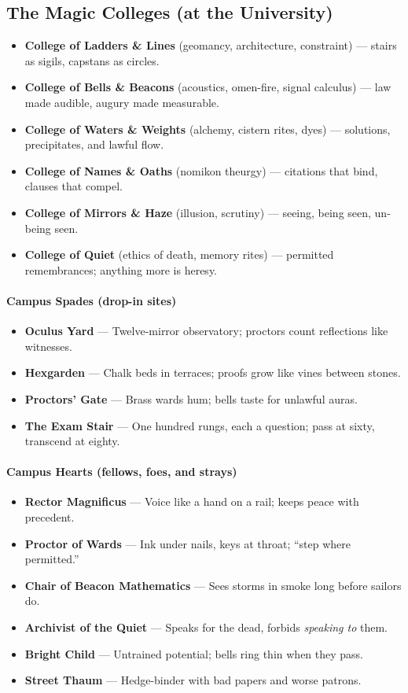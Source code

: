 \subsection*{The Magic Colleges (at the University)}
\label{sec:thepyrgos-colleges}
\begin{itemize}
  \item \textbf{College of Ladders \& Lines} (geomancy, architecture, constraint) — stairs as sigils, capstans as circles.
  \item \textbf{College of Bells \& Beacons} (acoustics, omen-fire, signal calculus) — law made audible, augury made measurable.
  \item \textbf{College of Waters \& Weights} (alchemy, cistern rites, dyes) — solutions, precipitates, and lawful flow.
  \item \textbf{College of Names \& Oaths} (nomikon theurgy) — citations that bind, clauses that compel.
  \item \textbf{College of Mirrors \& Haze} (illusion, scrutiny) — seeing, being seen, un-being seen.
  \item \textbf{College of Quiet} (ethics of death, memory rites) — permitted remembrances; anything more is heresy.
\end{itemize}

\paragraph{Campus Spades (drop-in sites)}
\begin{itemize}
  \item \textbf{Oculus Yard} — Twelve-mirror observatory; proctors count reflections like witnesses.
  \item \textbf{Hexgarden} — Chalk beds in terraces; proofs grow like vines between stones.
  \item \textbf{Proctors’ Gate} — Brass wards hum; bells taste for unlawful auras.
  \item \textbf{The Exam Stair} — One hundred rungs, each a question; pass at sixty, transcend at eighty.
\end{itemize}

\paragraph{Campus Hearts (fellows, foes, and strays)}
\begin{itemize}
  \item \textbf{Rector Magnificus} — Voice like a hand on a rail; keeps peace with precedent.
  \item \textbf{Proctor of Wards} — Ink under nails, keys at throat; “step where permitted.”
  \item \textbf{Chair of Beacon Mathematics} — Sees storms in smoke long before sailors do.
  \item \textbf{Archivist of the Quiet} — Speaks for the dead, forbids \emph{speaking to} them.
  \item \textbf{Bright Child} — Untrained potential; bells ring thin when they pass.
  \item \textbf{Street Thaum} — Hedge-binder with bad papers and worse patrons.
\end{itemize}

